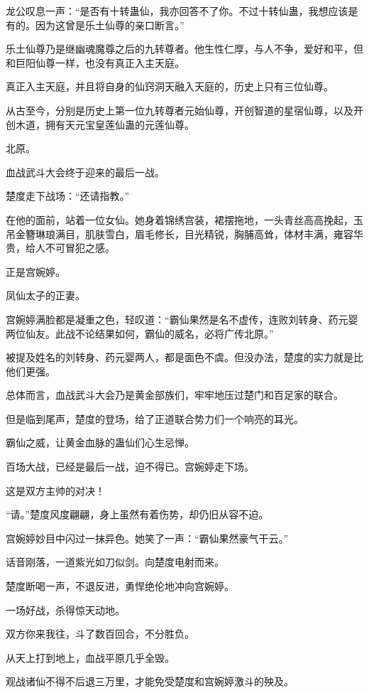 
\begin{this_body}

龙公叹息一声：“是否有十转蛊仙，我亦回答不了你。不过十转仙蛊，我想应该是有的。因为这曾是乐土仙尊的亲口断言。”

乐土仙尊乃是继幽魂魔尊之后的九转尊者。他生性仁厚，与人不争，爱好和平，但和巨阳仙尊一样，也没有真正入主天庭。

真正入主天庭，并且将自身的仙窍洞天融入天庭的，历史上只有三位仙尊。

从古至今，分别是历史上第一位九转尊者元始仙尊，开创智道的星宿仙尊，以及开创木道，拥有天元宝皇莲仙蛊的元莲仙尊。

北原。

血战武斗大会终于迎来的最后一战。

楚度走下战场：“还请指教。”

在他的面前，站着一位女仙。她身着锦绣宫装，裙摆拖地，一头青丝高高挽起，玉吊金簪琳琅满目，肌肤雪白，眉毛修长，目光精锐，胸脯高耸，体材丰满，雍容华贵，给人不可冒犯之感。

正是宫婉婷。

凤仙太子的正妻。

宫婉婷满脸都是凝重之色，轻叹道：“霸仙果然是名不虚传，连败刘转身、药元婴两位仙友。此战不论结果如何，霸仙的威名，必将广传北原。”

被提及姓名的刘转身、药元婴两人，都是面色不虞。但没办法，楚度的实力就是比他们更强。

总体而言，血战武斗大会乃是黄金部族们，牢牢地压过楚门和百足家的联合。

但是临到尾声，楚度的登场，给了正道联合势力们一个响亮的耳光。

霸仙之威，让黄金血脉的蛊仙们心生忌惮。

百场大战，已经是最后一战，迫不得已。宫婉婷走下场。

这是双方主帅的对决！

“请。”楚度风度翩翩，身上虽然有着伤势，却仍旧从容不迫。

宫婉婷妙目中闪过一抹异色。她笑了一声：“霸仙果然豪气干云。”

话音刚落，一道紫光如刀似剑。向楚度电射而来。

楚度断喝一声，不退反进，勇悍绝伦地冲向宫婉婷。

一场好战，杀得惊天动地。

双方你来我往，斗了数百回合，不分胜负。

从天上打到地上，血战平原几乎全毁。

观战诸仙不得不后退三万里，才能免受楚度和宫婉婷激斗的殃及。


\end{this_body}

